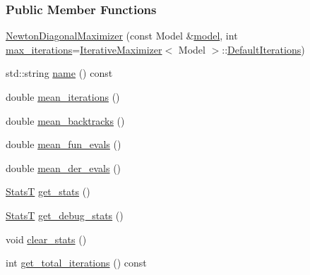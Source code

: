 \subsubsection*{Public Member Functions}
\begin{DoxyCompactItemize}
\item 
\hyperlink{classmappel_1_1estimator_1_1NewtonDiagonalMaximizer_aa30eb281554404470b4776593c33e779}{Newton\+Diagonal\+Maximizer} (const Model \&\hyperlink{classmappel_1_1estimator_1_1Estimator_a2f157410771fb79a20d4d54e505750d0}{model}, int \hyperlink{classmappel_1_1estimator_1_1IterativeMaximizer_abf5fe0b08cfbcc403c3d01511726aa38}{max\+\_\+iterations}=\hyperlink{classmappel_1_1estimator_1_1IterativeMaximizer}{Iterative\+Maximizer}$<$ Model $>$\+::\hyperlink{classmappel_1_1estimator_1_1IterativeMaximizer_ab66c01c2eee630f3fca119f3fe09a19a}{Default\+Iterations})
\item 
std\+::string \hyperlink{classmappel_1_1estimator_1_1NewtonDiagonalMaximizer_aab4eb75776c15120b27b3bb023e4e0ed}{name} () const 
\item 
double \hyperlink{classmappel_1_1estimator_1_1IterativeMaximizer_a70504eeacb590296d249a51970736d3a}{mean\+\_\+iterations} ()
\item 
double \hyperlink{classmappel_1_1estimator_1_1IterativeMaximizer_a26cc129f7253798b7484a25ac59dfa71}{mean\+\_\+backtracks} ()
\item 
double \hyperlink{classmappel_1_1estimator_1_1IterativeMaximizer_ad6a2fc4797c19c411fde894669f1edba}{mean\+\_\+fun\+\_\+evals} ()
\item 
double \hyperlink{classmappel_1_1estimator_1_1IterativeMaximizer_a0fbb35e6f015bf1e1c5b1ee89f08cbad}{mean\+\_\+der\+\_\+evals} ()
\item 
\hyperlink{namespacemappel_a04ab395b0cf82c4ce68a36b2212649a5}{StatsT} \hyperlink{classmappel_1_1estimator_1_1IterativeMaximizer_a8a274f11cad09057aa2b0bc69f291c22}{get\+\_\+stats} ()
\item 
\hyperlink{namespacemappel_a04ab395b0cf82c4ce68a36b2212649a5}{StatsT} \hyperlink{classmappel_1_1estimator_1_1IterativeMaximizer_aa8f8cb9c66b559badee924617ec690b6}{get\+\_\+debug\+\_\+stats} ()
\item 
void \hyperlink{classmappel_1_1estimator_1_1IterativeMaximizer_a9c41aae7db286746e72e3d0ff8af1d13}{clear\+\_\+stats} ()
\item 
int \hyperlink{classmappel_1_1estimator_1_1IterativeMaximizer_a8c639ea1bf84e4531364906c933584af}{get\+\_\+total\+\_\+iterations} () const 
\item 

\end{DoxyCompactItemize}
